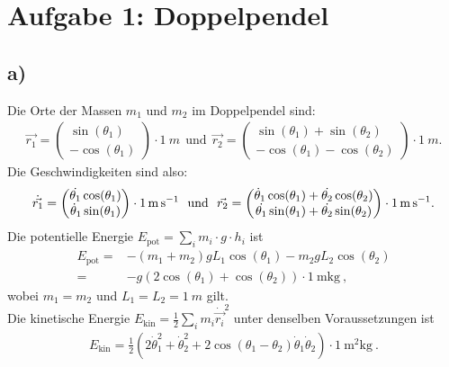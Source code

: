 
\section*{Aufgabe 1: Doppelpendel}
\subsection*{a)}
Die Orte der Massen $m_1$ und $m_2$ im Doppelpendel sind:
\begin{align}
\vec{r_1}=\begin{pmatrix}\sin(\theta_1)\\-\cos(\theta_1)\end{pmatrix}
\cdot\SI{1}{m}~~\text{und}~~
\vec{r_2}=\begin{pmatrix}\sin(\theta_1)+\sin(\theta_2)\\-\cos(\theta_1)-\cos(\theta_2)\end{pmatrix}\cdot\SI{1}{m}.
\end{align}
Die Geschwindigkeiten sind also:
\begin{align}
\dot{\vec{r_1}}=\begin{pmatrix}\dot{\theta_1}\cos(\theta_1)\\\dot\theta_1\sin(\theta_1)\end{pmatrix}\cdot\SI{1}{\meter\per\second}
~~\text{und}~~
\vec{r_2}=\begin{pmatrix}\dot\theta_1\cos(\theta_1)+\dot{\theta_2}\cos(\theta_2)\\\-\dot{\theta_1}\sin(\theta_1)+\dot{\theta_2}\sin(\theta_2)\end{pmatrix}\cdot\SI{1}{\meter\per\second}.
\end{align}
Die potentielle Energie $E_\text{pot}=\sum\limits_{i}m_i\cdot g\cdot h_i$ ist
\begin{align}
E_\text{pot}=&-(m_1+m_2)gL_1\cos(\theta_1)-m_2gL_2\cos(\theta_2)\\
=&-g(2\cos(\theta_1)+\cos(\theta_2))\cdot\SI{1}{\meter\kilogram}~,
\end{align}
wobei $m_1=m_2$ und $L_1=L_2=\SI{1}{m}$ gilt.\\
Die kinetische Energie $E_\text{kin}=\frac{1}{2}\sum\limits_{i}m_i{\dot{\vec{r_i}}}^2$ unter denselben Voraussetzungen ist
\begin{align}
E_\text{kin}=\frac{1}{2}\left(2\dot\theta_1^2+\dot\theta_2^2+2\cos(\theta_1-\theta_2)\dot\theta_1\dot\theta_2\right)\cdot\SI{1}{\square\meter\kilogram}~.
\end{align}

